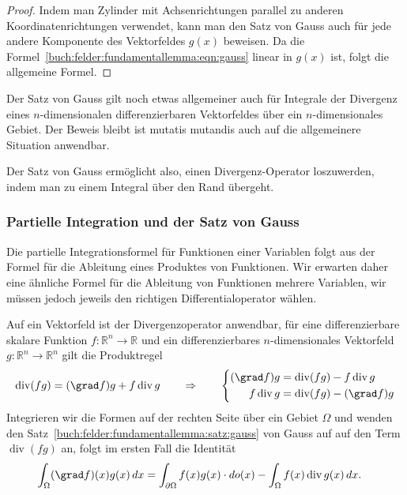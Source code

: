 \begin{proof}
Indem man Zylinder mit Achsenrichtungen parallel zu anderen
Koordinatenrichtungen verwendet, kann man den Satz von Gauss auch für
jede andere Komponente des Vektorfeldes $g(x)$ beweisen.
Da die Formel~\eqref{buch:felder:fundamentallemma:eqn:gauss} 
linear in $g(x)$ ist, folgt die allgemeine Formel.
\end{proof}

Der Satz von Gauss gilt noch etwas allgemeiner auch für Integrale der
Divergenz eines $n$-dimensionalen differenzierbaren Vektorfeldes über
ein $n$-dimensionales Gebiet.
Der Beweis bleibt ist mutatis mutandis auch auf die allgemeinere Situation
anwendbar.

Der Satz von Gauss ermöglicht also, einen Divergenz-Operator loszuwerden,
indem man zu einem Integral über den Rand übergeht.

%
%
\subsubsection{Partielle Integration und der Satz von Gauss}
Die partielle Integrationsformel für Funktionen einer Variablen folgt aus
der Formel für die Ableitung eines Produktes von Funktionen.
Wir erwarten daher eine ähnliche Formel für die Ableitung von
Funktionen mehrere Variablen, wir müssen jedoch jeweils den richtigen
Differentialoperator wählen.

Auf ein Vektorfeld ist der Divergenzoperator anwendbar, für eine
differenzierbare skalare Funktion $f\colon\mathbb{R}^n\to\mathbb{R}$
und ein differenzierbares $n$-dimensionales Vektorfeld
$g\colon\mathbb{R}^n\to\mathbb{R}^n$ gilt die Produktregel
\[
\operatorname{div}(fg)
=
(\grad f)g
+
f\operatorname{div}g
\qquad\Rightarrow\qquad
\left\{
\begin{aligned}
(\grad f)g &= \operatorname{div}(fg) - f\operatorname{div}g \\
f\operatorname{div}g &= \operatorname{div}(fg) - (\grad f)g
\end{aligned}
\right.
\]
Integrieren wir die Formen auf der rechten Seite über ein Gebiet $\Omega$
und wenden den Satz~\ref{buch:felder:fundamentallemma:satz:gauss}
von Gauss auf auf den Term $\operatorname{div}(fg)$ an, folgt im
ersten Fall die Identität
\begin{align*}
\int_{\Omega} (\grad f)(x) g(x)\,dx
&=
\int_{\partial\Omega} f(x)g(x)\cdot do(x)
-
\int_{\Omega} f(x)\operatorname{div}g(x)\,dx.
\end{align*}


